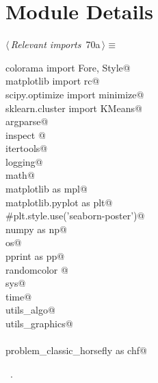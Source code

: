 \documentclass[11.5pt]{report}
\begin{document}
\section{Module Details}
\newchunk 
\begin{flushleft} \small
\begin{minipage}{\linewidth}\label{scrap101}\raggedright\small
{} $\langle\,${\itshape Relevant imports}\nobreak\ {\footnotesize {70a}}$\,\rangle\equiv$
\vspace{-1ex}
\begin{list}{}{} \item
\mbox{}\verb@from colorama import Fore, Style@\\
\mbox{}\verb@from matplotlib import rc@\\
\mbox{}\verb@from scipy.optimize import minimize@\\
\mbox{}\verb@from sklearn.cluster import KMeans@\\
\mbox{}\verb@import argparse@\\
\mbox{}\verb@import inspect @\\
\mbox{}\verb@import itertools@\\
\mbox{}\verb@import logging@\\
\mbox{}\verb@import math@\\
\mbox{}\verb@import matplotlib as mpl@\\
\mbox{}\verb@import matplotlib.pyplot as plt@\\
\mbox{}\verb@#plt.style.use('seaborn-poster')@\\
\mbox{}\verb@import numpy as np@\\
\mbox{}\verb@import os@\\
\mbox{}\verb@import pprint as pp@\\
\mbox{}\verb@import randomcolor @\\
\mbox{}\verb@import sys@\\
\mbox{}\verb@import time@\\
\mbox{}\verb@import utils_algo@\\
\mbox{}\verb@import utils_graphics@\\
\mbox{}\verb@@\\
\mbox{}\verb@import problem_classic_horsefly as chf@\\
\mbox{}\verb@@{\NWsep}
\end{list}
\vspace{-1.5ex}
\footnotesize
\begin{list}{}{\setlength{\itemsep}{-\parsep}\setlength{\itemindent}{-\leftmargin}}
\item \NWtxtMacroRefIn\ .

\item{}
\end{list}
\end{minipage}\vspace{4ex}
\end{flushleft}
\end{document}
